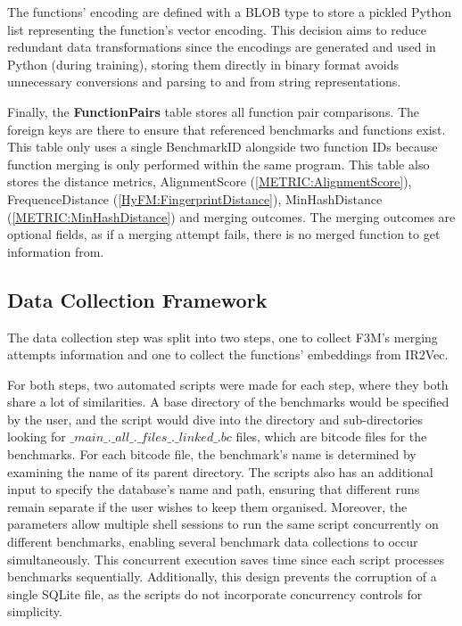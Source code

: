 The functions' encoding are defined with a BLOB type to store a pickled Python list representing the function's vector encoding. This decision aims to reduce redundant data transformations since the encodings are generated and used in Python (during training), storing them directly in binary format avoids unnecessary conversions and parsing to and from string representations.

Finally, the \textbf{FunctionPairs} table stores all function pair comparisons. The foreign keys are there to ensure that referenced benchmarks and functions exist. This table only uses a single BenchmarkID alongside two function IDs because function merging is only performed within the same program. This table also stores the distance metrics, AlignmentScore (\ref{METRIC:AlignmentScore}), FrequenceDistance (\ref{HyFM:FingerprintDistance}), MinHashDistance (\ref{METRIC:MinHashDistance}) and merging outcomes. The merging outcomes are optional fields, as if a merging attempt fails, there is no merged function to get information from.


\subsection{Data Collection Framework}
The data collection step was split into two steps, one to collect F3M's merging attempts information and one to collect the functions' embeddings from IR2Vec.

For both steps, two automated scripts were made for each step, where they both share a lot of similarities. A base directory of the benchmarks would be specified by the user, and the script would dive into the directory and sub-directories looking for $\_main\_.\_all\_.\_files\_.\_linked\_.bc$ files, which are bitcode files for the benchmarks. For each bitcode file, the benchmark's name is determined by examining the name of its parent directory. The scripts also has an additional input to specify the database's name and path, ensuring that different runs remain separate if the user wishes to keep them organised. Moreover, the parameters allow multiple shell sessions to run the same script concurrently on different benchmarks, enabling several benchmark data collections to occur simultaneously. This concurrent execution saves time since each script processes benchmarks sequentially. Additionally, this design prevents the corruption of a single SQLite file, as the scripts do not incorporate concurrency controls for simplicity.


